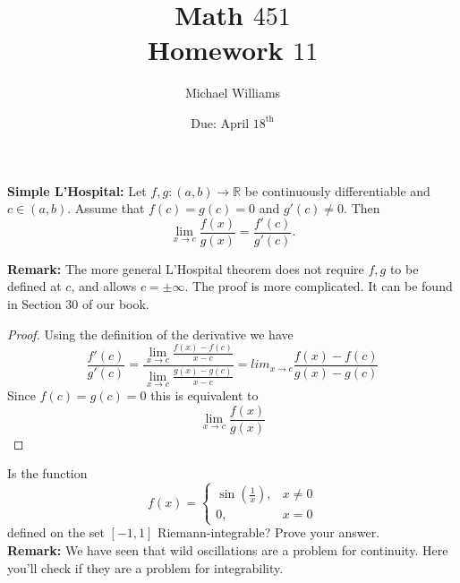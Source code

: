 \documentclass{exam}
\title{Math $451$ \\ Homework $11$}
\author{Michael Williams}
\date{Due: April $18^{\text{th}}$}
\begin{document}
\maketitle
\thispagestyle{empty}

\begin{problem}
\end{problem}

\begin{mybox}


  \textbf{Simple L'Hospital:} Let $f, g : (a, b) \rightarrow \mathbb{R}$
  be continuously differentiable and $c \in (a, b)$.
  Assume that $f(c) = g(c) = 0$ and $g'(c) \neq 0$. Then
  \[
  \lim_{x \to c} \frac{f(x)}{g(x)} = \frac{f'(c)}{g'(c)}.
  \]

  \textbf{Remark:} The more general L'Hospital theorem does not require
  $f, g$ to be defined at $c$, and allows $c = \pm\infty$.
  The proof is more complicated. It can be found in Section 30 of our book.


\end{mybox}

\begin{proof}
  Using the definition of the derivative we have 
  $$\frac{f'(c)}{g'(c)} = \frac{\lim_{x\rightarrow c}
  \frac{f(x)-f(c)}{x-c}}{\lim_{x\rightarrow c}\frac{g(x)-g(c)}{x-c}} =
  lim_{x\rightarrow c}\frac{f(x)-f(c)}{g(x)-g(c)}$$
  Since $f(c)=g(c)=0$ this is equivalent to $$\lim_{x \to c}
   \frac{f(x)}{g(x)}$$
\end{proof}

\begin{rating}
\end{rating}

\begin{problem}
\end{problem}

\begin{mybox}
 
  Is the function $$f(x) = \begin{cases} \sin\left(\frac{1}{x}\right),
  & x \neq 0 \\ 0, & x = 0 \end{cases}$$ defined on the set $[-1, 1]$
  Riemann-integrable? Prove your answer.
  \\
  
  \textbf{Remark:} We have seen that wild oscillations are a problem for
  continuity. Here you'll check if they are a problem for integrability.
  
\end{mybox}
\end{document}
